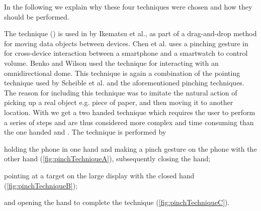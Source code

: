 In the following we explain why these four techniques were chosen and how they should be performed.

The \pinch technique () is used in \cite{Ikematsu:2015} by Ikematsu et al., as part of a drag-and-drop method for moving data objects between devices.
Chen et al. uses a pinching gesture in \cite{Chen:2014} for cross-device interaction between a smartphone and a smartwatch to control volume. 
Benko and Wilson \cite{Benko:2010} used the \pinch technique for interacting with an omnidirectional dome.
This technique is again a combination of the pointing technique used by Scheible et al. \cite{Scheible:2008} and the aforementioned pinching techniques. 
The reason for including this technique was to imitate the natural action of picking up a real object e.g. piece of paper, and then moving it to another location.
With \pinch we get a two handed technique which requires the user to perform a series of steps and are thus considered more complex and time consuming  than the one handed \swipe and \tilt.
The \pinch technique is performed by 
\begin{enumerate*}[label=\itshape\roman*\upshape)]
	\item{holding the phone in one hand and making a pinch gesture on the phone with the other hand (\cref{fig:pinchTechniqueA}), subsequently closing the hand;}
	\item{pointing at a target on the large display with the closed hand (\cref{fig:pinchTechniqueB});}
	\item{and opening the hand to complete the technique (\cref{fig:pinchTechniqueC}).}
\end{enumerate*}


